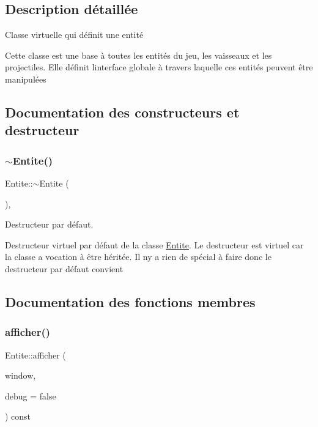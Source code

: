 \subsection{Description détaillée}
Classe virtuelle qui définit une entité 

Cette classe est une base à toutes les entités du jeu, les vaisseaux et les projectiles. Elle définit l\textquotesingle{}interface globale à travers laquelle ces entités peuvent être manipulées 

\subsection{Documentation des constructeurs et destructeur}
\mbox{\label{class_entite_a8084762a25afbfbcdca31121a3dfcd87}} 
\subsubsection{\texorpdfstring{$\sim$\+Entite()}{~Entite()}}
{\footnotesize\ttfamily Entite\+::$\sim$\+Entite (\begin{DoxyParamCaption}{ }\end{DoxyParamCaption})\hspace{0.3cm}{\ttfamily [virtual]}, {\ttfamily [default]}}



Destructeur par défaut. 

Destructeur virtuel par défaut de la classe \hyperlink{class_entite}{Entite}. Le destructeur est virtuel car la classe a vocation à être héritée. Il n\textquotesingle{}y a rien de spécial à faire donc le destructeur par défaut convient 

\subsection{Documentation des fonctions membres}
\mbox{\label{class_entite_a91874d7e87f6cb479a3893fbedc6a4e3}} 
\subsubsection{\texorpdfstring{afficher()}{afficher()}}
{\footnotesize\ttfamily Entite\+::afficher (\begin{DoxyParamCaption}\item[{sf\+::\+Render\+Window \&}]{window,  }\item[{bool}]{debug = {\ttfamily false} }\end{DoxyParamCaption}) const}



